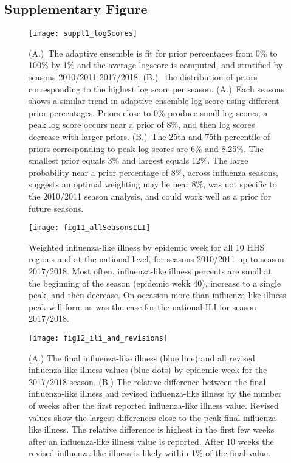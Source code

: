 \documentclass[sagev,times,Review,10pt]{sagej}
\begin{document}
\begin{appendix}
\section{Supplementary Figure}
\graphicspath{{../../../_6_TLGs/_G/suppl1_logScoreBySeasonForPrior/}}
\begin{figure}[ht!]
    \centering
    \texttt{[image: suppl1\_logScores]}
    \caption{
      (A.)~The adaptive ensemble is fit for prior percentages from 0\% to 100\% by 1\% and the average logscore is computed, and stratified by seasons 2010/2011-2017/2018.
      (B.)~ the distribution of priors corresponding to the highest log score per season.
      (A.)~Each seasons shows a similar trend in adaptive ensemble log score using different prior percentages.
      Priors close to 0\% produce small log scores, a peak log score occurs near a prior of 8\%, and then log scores decrease with larger priors.
      (B.)~The 25th and 75th percentile of priors corresponding to peak log scores are 6\% and 8.25\%.
      The smallest prior equals 3\% and largest equals 12\%.
      The large probability near a prior percentage of 8\%, across influenza seasons, suggests an optimal weighting may lie near 8\%, was not specific to the 2010/2011 season analysis, and could work well as a prior for future seasons.
      \label{suppl1.logScoresPerSeason}}
  \end{figure}


\graphicspath{{../../../_6_TLGs/_G/fig11_exampleForecasts/}}
\begin{figure}[ht!]
    \centering
    \texttt{[image: fig11\_allSeasonsILI]}
    \caption{
      Weighted influenza-like illness by epidemic week for all 10 HHS regions and at the national level, for seasons 2010/2011 up to season 2017/2018.
      Most often, influenza-like illness percents are small at the beginning of the season (epidemic wekk 40), increase to a single peak, and then decrease.
      On occasion more than influenza-like illness peak will form as was the case for the national ILI for season 2017/2018. \label{epicurves} }
\end{figure}

\graphicspath{{../../../_6_TLGs/_G/fig12_ili_and_revisions/}}
\begin{figure}[ht!]
    \centering
    \texttt{[image: fig12\_ili\_and\_revisions]}
    \caption{(A.) The final influenza-like illness (blue line) and all revised influenza-like illness values (blue dots) by epidemic week for the 2017/2018 season.
      (B.) The relative difference between the final influenza-like illness and revised influenza-like illness by the number of weeks after the first reported influenza-like illness value.
      Revised values show the largest differences close to the peak final influenza-like illness.
      The relative difference is highest in the first few weeks after an influenza-like illness value is reported.
      After 10 weeks the revised influenza-like illness is likely within 1\% of the final value.
      \label{revisions}
      }
\end{figure}
  

\end{appendix}
\end{document}
